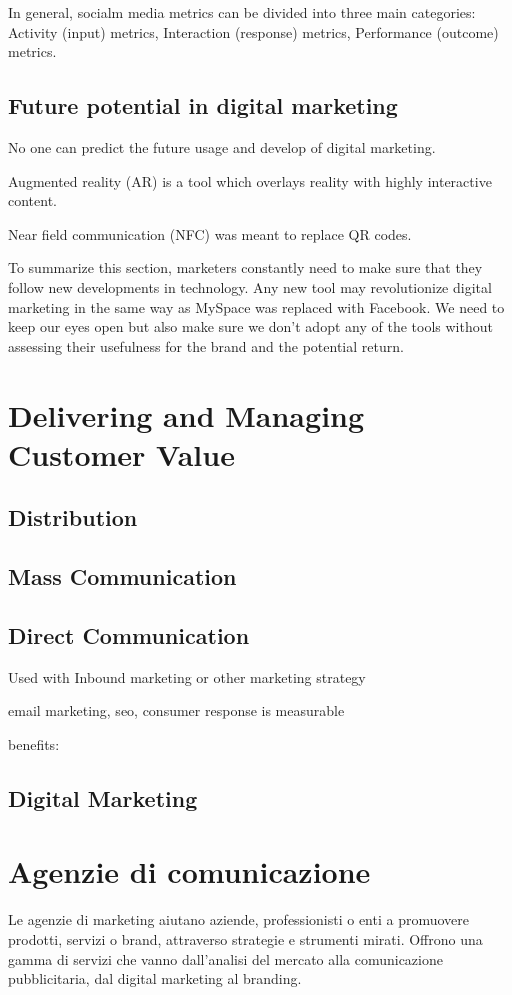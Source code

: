 \documentclass{article}
\begin{document}
In general, socialm media metrics can be divided into three main categories: Activity (input) metrics, Interaction (response) metrics, Performance (outcome) metrics.

\subsection{Future potential in digital marketing}
No one can predict the future usage and develop of digital marketing.

Augmented reality (AR) is a tool which overlays reality with highly interactive content.

Near field communication (NFC) was meant to replace QR codes.

To summarize this section, marketers constantly need to make sure that they follow new developments in technology. Any new tool may revolutionize digital marketing in the same way as MySpace was replaced with Facebook. We need to keep our eyes open but also make sure we don't adopt any of the tools without assessing their usefulness for the brand and the potential return.

\section{Delivering and Managing Customer Value}

\subsection{Distribution}

\subsection{Mass Communication}

\subsection{Direct Communication}
Used with Inbound marketing or other marketing strategy

email marketing, seo, 
consumer response is measurable

benefits: 

\subsection{Digital Marketing}

\section{Agenzie di comunicazione}
Le agenzie di marketing aiutano aziende, professionisti o enti a promuovere prodotti, servizi o brand, attraverso strategie e strumenti mirati. Offrono una gamma di servizi che vanno dall'analisi del mercato alla comunicazione pubblicitaria, dal digital marketing  al branding. 
\end{document}
